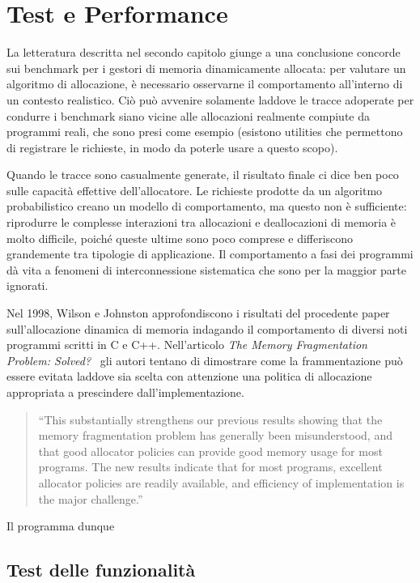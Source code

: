 \chapter[Test e Performance]{Test e Performance}

La letteratura descritta nel secondo capitolo giunge a una conclusione concorde sui benchmark per i gestori di memoria dinamicamente allocata: per valutare un algoritmo di allocazione, è necessario osservarne il comportamento all’interno di un contesto realistico. Ciò può avvenire solamente laddove le tracce adoperate per condurre i benchmark siano vicine alle allocazioni realmente compiute da programmi reali, che sono presi come esempio (esistono utilities che permettono di registrare le richieste, in modo da poterle usare a questo scopo).

Quando le tracce sono casualmente generate, il risultato finale ci dice ben poco sulle capacità effettive dell’allocatore. Le richieste prodotte da un algoritmo probabilistico creano un modello di comportamento, ma questo non è sufficiente: riprodurre le complesse interazioni tra allocazioni e deallocazioni di memoria è molto difficile, poiché queste ultime sono poco comprese e differiscono grandemente tra tipologie di applicazione. Il comportamento a fasi dei programmi dà vita a fenomeni di interconnessione sistematica che sono per la maggior parte ignorati.

Nel 1998, Wilson e Johnston approfondiscono i risultati del procedente paper sull’allocazione dinamica di memoria indagando il comportamento di diversi noti programmi scritti in C e C++. Nell’articolo \emph{The Memory Fragmentation Problem: Solved?}~\cite{wilson1998} gli autori tentano di dimostrare come la frammentazione può essere evitata laddove sia scelta con attenzione una politica di allocazione appropriata a prescindere dall’implementazione.

\begin{quote}
``This substantially strengthens our previous results showing that the memory fragmentation problem has generally been misunderstood, and that good allocator policies can provide good memory usage for most programs. The new results indicate that for most programs, excellent allocator policies are readily available, and efficiency of implementation is the major challenge.''
\end{quote}

Il programma dunque 


\pagebreak 

\section{Test delle funzionalità}

